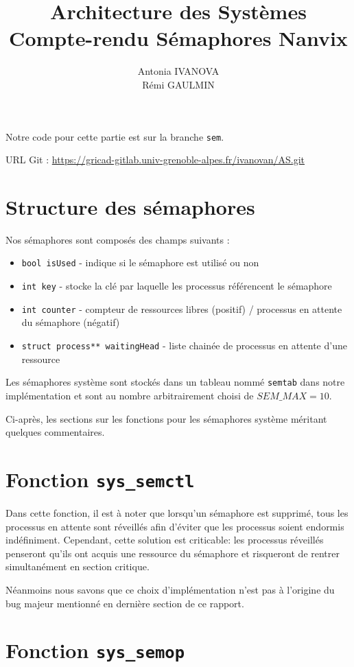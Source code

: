 \documentclass[a4paper,11pt,french]{article}
\title{Architecture des Systèmes\\Compte-rendu Sémaphores Nanvix}
\author{Antonia IVANOVA\\Rémi GAULMIN}
\begin{document}
\maketitle

Notre code pour cette partie est sur la branche \texttt{sem}.

URL Git : \url{https://gricad-gitlab.univ-grenoble-alpes.fr/ivanovan/AS.git}

\section{Structure des sémaphores}

Nos sémaphores sont composés des champs suivants : 
\begin{itemize}
	\item \texttt{bool isUsed}  -  indique si le sémaphore est utilisé ou non
	\item \texttt{int key}  -   stocke la clé par laquelle les processus référencent le sémaphore
	\item \texttt{int counter}  -  compteur de ressources libres (positif) / processus en attente du sémaphore (négatif)
	\item \texttt{struct process** waitingHead}  -  liste chainée de processus en attente d'une ressource
\end{itemize}

Les sémaphores système sont stockés dans un tableau nommé \texttt{semtab} dans notre implémentation et sont au nombre arbitrairement choisi de $SEM\_MAX = 10$.

Ci-après, les sections sur les fonctions pour les sémaphores système méritant quelques commentaires.

\section{Fonction \texttt{sys\_semctl}}

Dans cette fonction, il est à noter que lorsqu'un sémaphore est supprimé, tous les processus en attente sont réveillés afin d'éviter que les processus soient endormis indéfiniment.
Cependant, cette solution est criticable: les processus réveillés penseront qu'ils ont acquis une ressource du sémaphore et risqueront de rentrer simultanément en section critique.

Néanmoins nous savons que ce choix d'implémentation n'est pas à l'origine du bug majeur mentionné en dernière section de ce rapport.

\section{Fonction \texttt{sys\_semop}}
\end{document}
